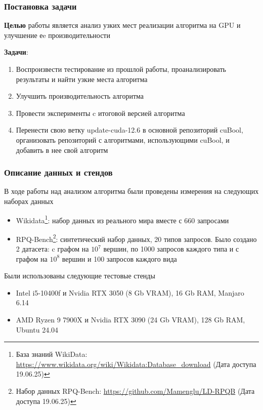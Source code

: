 \documentclass[aspectratio=169]{beamer}
\begin{document}
\begin{frame}
  \frametitle{Постановка задачи}

\textbf{Целью} работы является анализ узких мест реализации алгоритма на GPU и улучшение еe производительности

\textbf{Задачи}:
\begin{enumerate}
    \item Воспроизвести тестирование из прошлой работы, проанализировать результаты и найти узкие места алгоритма
    \item Улучшить производительность алгоритма
    \item Провести эксперименты c итоговой версией алгоритма
    \item Перенести свою ветку update-cuda-12.6 в основной репозиторий cuBool, организовать репозиторий с алгоритмами, использующими cuBool, и добавить в нее свой алгоритм
\end{enumerate}
\end{frame}

\begin{frame}
  \frametitle{Описание данных и стендов}
В ходе работы над анализом алгоритма были проведены измерения на следующих наборах данных
\begin{itemize}
    \item Wikidata\footnote{База знаний WikiData: \href{https://www.wikidata.org/wiki/Wikidata:Database_download}{https://www.wikidata.org/wiki/Wikidata:Database\_download} (Дата доступа 19.06.25)}: набор данных из реального мира вместе с 660 запросами
    \item RPQ-Bench\footnote{Набор данных RPQ-Bench: \url{https://github.com/Mamenglu/LD-RPQB} (Дата доступа 19.06.25)}: синтетический набор данных, 20 типов запросов. Было создано 2 датасета: c графом на $10^7$ вершин, по 1000 запросов каждого типа и с графом на $10^8$ вершин и 100 запросов каждого вида
\end{itemize}

Были использованы следующие тестовые стенды
\begin{itemize}
    \item Intel i5-10400f и Nvidia RTX 3050 (8 Gb VRAM), 16 Gb RAM, Manjaro 6.14
    \item AMD Ryzen 9 7900X и Nvidia RTX 3090 (24 Gb VRAM), 128 Gb RAM, Ubuntu 24.04
\end{itemize}

\end{frame}
 
\end{document}

